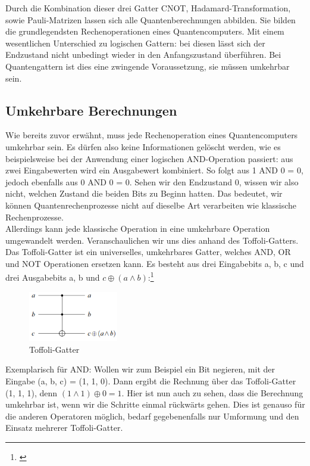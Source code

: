 Durch die Kombination dieser drei Gatter CNOT, Hadamard-Transformation, sowie Pauli-Matrizen lassen sich alle Quantenberechnungen abbilden.
Sie bilden die grundlegendsten Rechenoperationen eines Quantencomputers.
Mit einem wesentlichen Unterschied zu logischen Gattern: bei diesen lässt sich der Endzustand nicht unbedingt wieder in den Anfangszustand überführen.
Bei Quantengattern ist dies eine zwingende Voraussetzung, sie müssen umkehrbar sein.\\


\subsection{Umkehrbare Berechnungen}
\label{subsec:umkehrbare-berechnungen}

Wie bereits zuvor erwähnt, muss jede Rechenoperation eines Quantencomputers umkehrbar sein.
Es dürfen also keine Informationen gelöscht werden, wie es beispielsweise bei der Anwendung einer logischen AND-Operation passiert: aus zwei Eingabewerten wird ein Ausgabewert kombiniert.
So folgt aus 1 AND 0 = 0, jedoch ebenfalls aus 0 AND 0 = 0.
Sehen wir den Endzustand 0, wissen wir also nicht, welchen Zustand die beiden Bits zu Beginn hatten.
Das bedeutet, wir können Quantenrechenprozesse nicht auf dieselbe Art verarbeiten wie klassische Rechenprozesse.\\

Allerdings kann jede klassische Operation in eine umkehrbare Operation umgewandelt werden.
Veranschaulichen wir uns dies anhand des Toffoli-Gatters.\\

Das Toffoli-Gatter ist ein universelles, umkehrbares Gatter, welches AND, OR und NOT Operationen ersetzen kann.
Es besteht aus drei Eingabebits a, b, c und drei Ausgabebits a, b und $c\oplus(a\land b)$:\footnote{\cite[S. 87]{homeister_quantum_2022}}\\
\begin{figure}[H]
    \centering
    \includegraphics[width=0.35\textwidth]{img/Umkehrbare_Berechnungen Toffoli}
    \caption{Toffoli-Gatter}
    \label{fig:toffoli-gatter}
\end{figure}

Exemplarisch für AND: Wollen wir zum Beispiel ein Bit negieren, mit der Eingabe (a, b, c) = (1, 1, 0).
Dann ergibt die Rechnung über das Toffoli-Gatter (1, 1, 1), denn $(1\land 1) \oplus 0 = 1$.
Hier ist nun auch zu sehen, dass die Berechnung umkehrbar ist, wenn wir die Schritte einmal rückwärts gehen.
Dies ist genauso für die anderen Operatoren möglich, bedarf gegebenenfalls nur Umformung und den Einsatz mehrerer Toffoli-Gatter.\\

